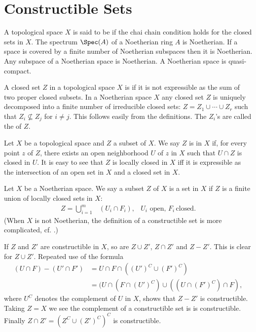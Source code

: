 \documentclass[../main]{subfiles}
\begin{document}

\section{Constructible Sets}\label{sec:06}

\newparagraph A topological space $X$ is said to be  if the  chai chain condition holds for the closed sets in $X$. The spectrum $\Spec(A)$ of a Noetherian ring $A$ is Noetherian. If a space is covered by a finite number of Noetherian subspaces then it is Noetherian. Any subspace of a Noetherian space is Noetherian. A Noetherian space is quasi-compact.

A closed set $Z$ in a topological space $X$ is  if it is not expressible as the sum of two proper closed subsets. In a Noetherian space $X$ any closed set $Z$ is uniquely decomposed into a finite number of irreducible closed sets: $Z = Z_1 \cup \cdots \cup Z_r$ such that $Z_i \not\subseteq Z_j$ for $i \ne j$. This follows easily from the definitions. The $Z_i$'s are called the  of $Z$. 

\newparagraph Let $X$ be a topological space and $Z$ a subset of $X$. We say $Z$ is  in $X$ if, for every point $z$ of $Z$, there exists an open neighborhood $U$ of $z$ in $X$ such that $U \cap Z$ is closed in $U$. It is easy to see that $Z$ is locally closed in $X$ iff it is expressible as the intersection of an open set in $X$ and a closed set in $X$.

Let $X$ be a Noetherian space. We say a subset $Z$ of $X$ is a  set in $X$ if $Z$ is a finite union of locally closed sets in $X$:
\[
\begin{aligned}
Z = \bigcup_{i=1} ^m &(U_i \cap F_i), &U_i \text{ open, } F_i\, \text{closed.}
\end{aligned}
\]
(When $X$ is not Noetherian, the definition of a constructible set is more complicated, cf. \cite{egaIII}.)

If $Z$ and $Z'$ are constructible in $X$, so are $Z\cup Z'$, $Z\cap Z'$ and $Z - Z'$. This is clear for $Z \cup Z'$. Repeated use of the formula
\begin{align*}
(U \cap F) - (U' \cap F') 
&= U \cap F \cap ((U')^C \cup (F')^C)\\
&= (U \cap (F \cap (U')^C) \cup ((U \cap (F')^C) \cap F),
\end{align*}
where $U^C$ denotes the complement of $U$ in $X$, shows that $Z- Z'$ is constructible. Taking $Z=X$ we see the complement of a constructible set is is constructible. Finally $Z \cap Z' = (Z^C \cup (Z')^C)^C$ is constructible.
\end{document}
